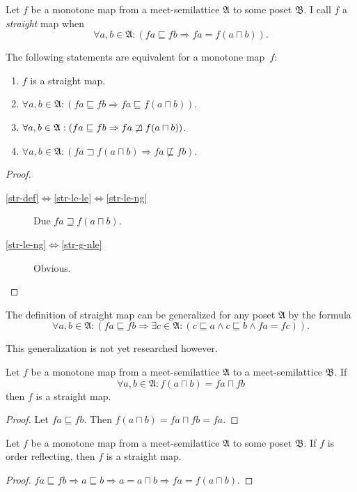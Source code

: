 \begin{defn}
Let $f$ be a monotone map from a meet-semilattice
$\mathfrak{A}$ to some poset $\mathfrak{B}$. I call $f$ a \emph{straight}
map when
\[
\forall a,b\in\mathfrak{A}:(fa\sqsubseteq fb\Rightarrow fa=f(a\sqcap b)).
\]
\end{defn}
\begin{prop}
The following statements are equivalent for a monotone map~$f$:
\begin{enumerate}
\item \label{str-def}$f$ is a straight map.
\item \label{str-le-le}$\forall a,b\in\mathfrak{A}:(fa\sqsubseteq fb\Rightarrow fa\sqsubseteq f(a\sqcap b))$.
\item \label{str-le-ng}$\forall a,b\in\mathfrak{A}:(fa\sqsubseteq fb\Rightarrow fa\not\sqsupset f(a\sqcap b))$.
\item \label{str-g-nle}$\forall a,b\in\mathfrak{A}:(fa\sqsupset f(a\sqcap b)\Rightarrow fa\nsqsubseteq fb)$.
\end{enumerate}
\end{prop}
\begin{proof}
~
\begin{description}
\item [{\ref{str-def}$\Leftrightarrow$\ref{str-le-le}$\Leftrightarrow$\ref{str-le-ng}}] Due
$fa\sqsupseteq f(a\sqcap b)$.
\item [{\ref{str-le-ng}$\Leftrightarrow$\ref{str-g-nle}}] Obvious.
\end{description}
\end{proof}
\begin{rem}
The definition of straight map can be generalized for any poset $\mathfrak{A}$
by the formula
\[
\forall a,b\in\mathfrak{A}:(fa\sqsubseteq fb\Rightarrow\exists c\in\mathfrak{A}:(c\sqsubseteq a\land c\sqsubseteq b\land fa=fc)).
\]


This generalization is not yet researched however.\end{rem}
\begin{prop}
Let $f$ be a monotone map from a meet-semilattice $\mathfrak{A}$
to a meet-semilattice $\mathfrak{B}$. If
\[
\forall a,b\in\mathfrak{A}:f(a\sqcap b)=fa\sqcap fb
\]
then $f$ is a straight map.\end{prop}
\begin{proof}
Let $fa\sqsubseteq fb$. Then $f(a\sqcap b)=fa\sqcap fb=fa$.\end{proof}
\begin{prop}
Let $f$ be a monotone map from a meet-semilattice $\mathfrak{A}$
to some poset $\mathfrak{B}$. If $f$ is order reflecting,
then $f$ is a straight map.\end{prop}
\begin{proof}
$fa\sqsubseteq fb\Rightarrow a\sqsubseteq b\Rightarrow a=a\sqcap b\Rightarrow fa=f(a\sqcap b)$.\end{proof}

